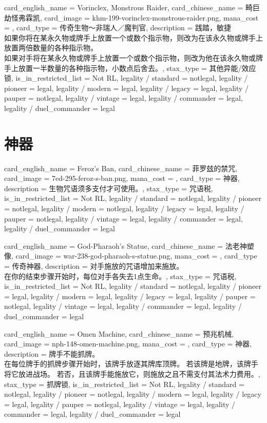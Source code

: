 \documentclass[lang = cn, color = black, 10pt]{AllThatStax}
\begin{document}
\card
{
	card_english_name = {Vorinclex, Monstrous Raider},
	card_chinese_name = {畸巨劫怪弗霖凯},
	card_image = khm-199-vorinclex-monstrous-raider.png,
	mana_cost = ,
	card_type = 传奇生物～非瑞人／魔判官,
	description = {践踏，敏捷\\
如果你将在某永久物或牌手上放置一个或数个指示物，则改为在该永久物或牌手上放置两倍数量的各种指示物。\\
如果对手将在某永久物或牌手上放置一个或数个指示物，则改为他在该永久物或牌手上放置一半数量的各种指示物，小数点后舍去。},
	stax_type = 其他异能/效应锁,
	is_in_restricted_list = Not RL,
	legality / standard = notlegal,
	legality / pioneer = legal,
	legality / modern = legal,
	legality / legacy = legal,
	legality / pauper = notlegal,
	legality / vintage = legal,
	legality / commander = legal,
	legality / duel_commander = legal
}

\section{神器}

\card
{
	card_english_name = {Feroz's Ban},
	card_chinese_name = {菲罗玆的禁咒},
	card_image = 7ed-295-feroz-s-ban.png,
	mana_cost = ,
	card_type = 神器,
	description = {生物咒语须多支付才可使用。},
	stax_type = 咒语税,
	is_in_restricted_list = Not RL,
	legality / standard = notlegal,
	legality / pioneer = notlegal,
	legality / modern = notlegal,
	legality / legacy = legal,
	legality / pauper = notlegal,
	legality / vintage = legal,
	legality / commander = legal,
	legality / duel_commander = legal
}

\card
{
	card_english_name = {God-Pharaoh's Statue},
	card_chinese_name = {法老神塑像},
	card_image = war-238-god-pharaoh-s-statue.png,
	mana_cost = ,
	card_type = 传奇神器,
	description = {对手施放的咒语增加来施放。\\
在你的结束步骤开始时，每位对手各失去1点生命。},
	stax_type = 咒语税,
	is_in_restricted_list = Not RL,
	legality / standard = notlegal,
	legality / pioneer = legal,
	legality / modern = legal,
	legality / legacy = legal,
	legality / pauper = notlegal,
	legality / vintage = legal,
	legality / commander = legal,
	legality / duel_commander = legal
}

\card
{
	card_english_name = {Omen Machine},
	card_chinese_name = {预兆机械},
	card_image = nph-148-omen-machine.png,
	mana_cost = ,
	card_type = 神器,
	description = {牌手不能抓牌。\\
在每位牌手的抓牌步骤开始时，该牌手放逐其牌库顶牌。 若该牌是地牌，该牌手将它放进战场。 若否，且该牌手能施放它，则施放之且不需支付其法术力费用。},
	stax_type = 抓牌锁,
	is_in_restricted_list = Not RL,
	legality / standard = notlegal,
	legality / pioneer = notlegal,
	legality / modern = legal,
	legality / legacy = legal,
	legality / pauper = notlegal,
	legality / vintage = legal,
	legality / commander = legal,
	legality / duel_commander = legal
}
\end{document}
